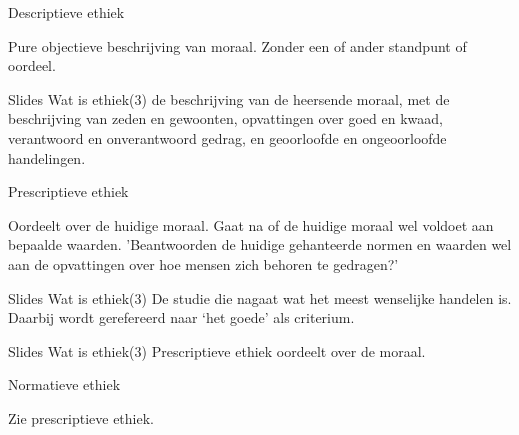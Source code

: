 \documentclass[main.tex]{subfiles}
\begin{document}
\begin{examenvraag}
    \begin{vraag}
        Descriptieve ethiek
    \end{vraag}

    \begin{antwoord}
        Pure objectieve beschrijving van moraal.
        Zonder een of ander standpunt of oordeel. 
        \begin{citaat}{Slides Wat is ethiek(3)}
            de beschrijving van de heersende moraal, met de beschrijving van zeden en gewoonten, opvattingen over goed en kwaad,
            verantwoord en onverantwoord gedrag, en geoorloofde en ongeoorloofde handelingen.
        \end{citaat}
    \end{antwoord}
\end{examenvraag}


\begin{examenvraag}
    \begin{vraag}
        Prescriptieve ethiek
    \end{vraag}

    \begin{antwoord}

        Oordeelt over de huidige moraal.
        Gaat na of de huidige moraal wel voldoet aan bepaalde waarden. 
        'Beantwoorden de huidige gehanteerde normen en waarden wel aan de opvattingen over hoe mensen zich behoren te gedragen?'

        \begin{citaat}{Slides Wat is ethiek(3)}
            De studie die nagaat wat het meest wenselijke handelen is. 
            Daarbij wordt gerefereerd naar ‘het goede’ als criterium.
        \end{citaat}
        \begin{citaat}{Slides Wat is ethiek(3)}
            Prescriptieve ethiek oordeelt over de moraal.
        \end{citaat}
    \end{antwoord}
\end{examenvraag}


\begin{examenvraag}
    \begin{vraag}
        Normatieve ethiek
    \end{vraag}

    \begin{antwoord}
        Zie prescriptieve ethiek.
    \end{antwoord}
\end{examenvraag}
\end{document}
